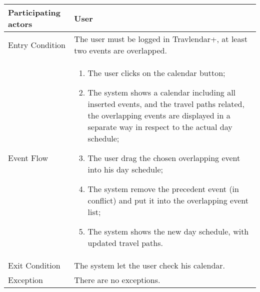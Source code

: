 \begin{table}[H]
	\begin{center}
		\begin{tabular}{ | p{} | p{} | }
		\hline
		Participating actors & User\\
		\hline
		Entry Condition & The user must be logged in Travlendar+, at least two events are overlapped.\\
		\hline
		Event Flow & 
			\begin{enumerate}
				\item The user clicks on the calendar button;
				\item The system shows a calendar including all inserted events, and the travel paths related, the overlapping events are displayed in a separate way in respect to the actual day schedule;
				\item The user drag the chosen overlapping event into his day schedule;
				\item The system remove the precedent event (in conflict) and put it into the overlapping event list;
				\item The system shows the new day schedule, with updated travel paths.
			\end{enumerate} \\
		\hline
		Exit Condition & The system let the user check his calendar. \\
		\hline
		Exception & There are no exceptions.\\ 
		\hline
		\end{tabular}
	\end{center}
\end{table}